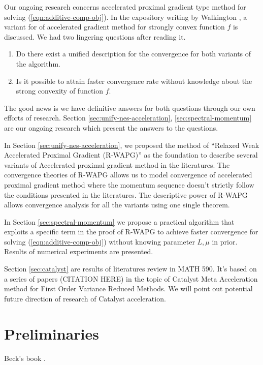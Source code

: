 \documentclass[12pt]{article}
\begin{document}
    \par
    Our ongoing research concerns accelerated proximal gradient type method for solving (\ref{eqn:additive-comp-obj}). 
    In the expository writing by Walkington \cite{noel_nesterovs_nodate}, a variant for of accelerated gradient method for strongly convex function $f$ is discussed. 
    We had two lingering questions after reading it. 
    \begin{enumerate}
        \item Do there exist a unified description for the convergence for both variants of the algorithm. 
        \item Is it possible to attain faster convergence rate without knowledge about the strong convexity of function $f$. 
    \end{enumerate}
    The good news is we have definitive answers for both questions through our own efforts of research. 
    Section \ref{sec:unify-nes-acceleration}, \ref{sec:spectral-momentum} are our ongoing research which present the answers to the questions. 
    \par
    In Section \ref{sec:unify-nes-acceleration}, we proposed the method of ``Relaxed Weak Accelerated Proximal Gradient (R-WAPG)'' as the foundation to describe several variants of Accelerated proximal gradient method in the literatures. 
    The convergence theories of R-WAPG allows us to model convergence of accelerated proximal gradient method where the momentum sequence doesn't strictly follow the conditions presented in the literatures. 
    The descriptive power of R-WAPG allows convergence analysis for all the variants using one single theorem. 
    \par
    In Section \ref{sec:spectral-momentum} we propose a practical algorithm that exploits a specific term in the proof of R-WAPG to achieve faster convergence for solving (\ref{eqn:additive-comp-obj}) without knowing parameter $L, \mu$ in prior. 
    Results of numerical experiments are presented. 
    \par
    Section \ref{sec:catalyst} are results of literatures review in MATH 590. 
    It's based on a series of papers (CITATION HERE) in the topic of Catalyst Meta Acceleration method for First Order Variance Reduced Methods. 
    We will point out potential future direction of research of Catalyst acceleration. 
    \par





    
\section{Preliminaries}
    Beck's book \cite{beck_first-order_2017}. 
\end{document}

